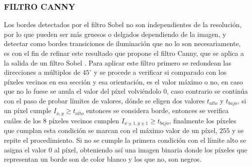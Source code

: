         \subsubsection{FILTRO CANNY}
        Los bordes detectados por el filtro Sobel no son independientes de la resolución, por lo que pueden ser más gruesos o delgados dependiendo de la imagen, y detectar como bordes transiciones de iluminación que no lo son necesariamente, es con el fin de refinar este resultado que propone el filtro Canny, que se aplica a la salida de un filtro Sobel \citep{canny}.
        Para aplicar este filtro primero se redondean las direcciones a múltiplos de $45^\circ$ y se procede a verificar si comparado con los píxeles vecinos en esa sección y esa orientación, es el valor máximo o no, en caso que no lo fuese se anula el valor del píxel volviéndolo $0$, caso contrario se continúa con el paso de probar límites de valores, dónde se eligen dos valores $t_{alto}$ y $t_{bajo}$, si un píxel cumple $I_{x,y} \ge t_{alto}$ entonces se considera borde, entonces se verifica cuáles de los 8 píxeles vecinos cumplen $I_{x\pm 1, y \pm 1} \ge t_{bajo}$, finalmente los píxeles que cumplan esta condición se marcan con el máximo valor de un píxel, $255$ y se repite el procedimiento. Si no se cumple la primera condición con el límite alto se asigna el valor $0$ al píxel, obteniendo así una imagen binaria donde los píxeles que representan un borde son de color blanco y los que no, son negros.
        
